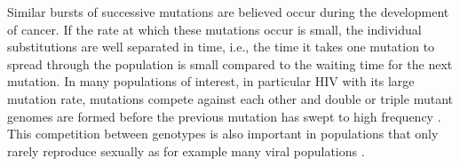 \documentclass[rmp,twocolumn]{revtex4}
\begin{document}
Similar bursts of successive mutations are believed occur during the development
of cancer. If the rate at which these mutations occur is small, the individual substitutions
are well separated in time, i.e., the time it takes one mutation to spread
through the population is small compared to the waiting time for the next
mutation. In many populations of interest, in particular HIV with its large
mutation rate, mutations compete against each other and double or triple
mutant genomes are formed before the previous mutation has
swept to high frequency \citep{Desai:2007p954,Beerenwinkel:2007p23640}. This
competition between genotypes is also important in populations that only rarely
reproduce sexually as for example many viral populations
\citep{Neher:2009p22302,Neher:2011p42539}.




\end{document}
